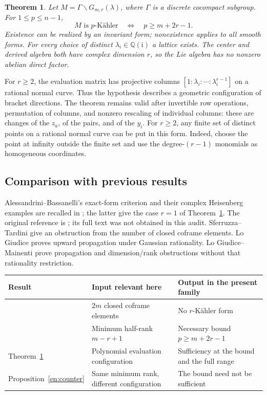 \documentclass[12pt]{amsart}
\newtheorem{thm}{Theorem}[section]
\theoremstyle{definition}
\theoremstyle{remark}
\numberwithin{equation}{section}
\newcommand{\Q}{\mathbb{Q}}
\newcommand{\ii}{\mathrm i}
\begin{document}
\begin{thm}\label{en:main}
Let $M=\Gamma\backslash G_{m,r}(\lambda)$, where $\Gamma$ is a discrete
cocompact subgroup. For $1\leq p\leq n-1$,
\begin{equation}\label{en:threshold}
 M\text{ is }p\text{-K\"ahler}
 \quad\Longleftrightarrow\quad p\geq m+2r-1.
\end{equation}
Existence can be realized by an invariant form; nonexistence applies to
all smooth forms. For every choice of distinct
$\lambda_i\in\Q(\ii)$ a lattice exists. The center and derived algebra
both have complex dimension $r$, so the Lie algebra has no nonzero
abelian direct factor.
\end{thm}

For $r\geq2$, the evaluation matrix has projective columns
$[1:\lambda_i:\cdots:\lambda_i^{r-1}]$ on a rational normal curve.
Thus the hypothesis describes a geometric configuration of bracket
directions. The theorem remains valid after invertible row operations,
permutation of columns, and nonzero rescaling of individual columns:
these are changes of the $z_a$, of the pairs, and of the $y_i$.
For $r\geq2$, any finite set of distinct points on a rational normal curve
can be put in this form. Indeed, choose the point at infinity outside the
finite set and use the degree-$(r-1)$ monomials as homogeneous coordinates.

\subsection{Comparison with previous results}
Alessandrini--Bassanelli's exact-form criterion and their complex
Heisenberg examples are recalled in \cite[Proposition 2.15 and
Example 2.16]{en:LM}; the latter give the case $r=1$ of
Theorem~\ref{en:main}. The original reference is \cite{en:AB}; its full
text was not obtained in this audit. Sferruzza--Tardini
\cite[Theorem 2.3]{en:ST} give an obstruction from the number of closed
coframe elements. Lo Giudice \cite[Theorem 4.1]{en:LG} proves upward
propagation under Gaussian rationality. Lo Giudice--Mainenti
\cite[Theorems 5.4--5.5 and Lemma 5.7]{en:LM} prove propagation and
dimension/rank obstructions without that rationality restriction.

\begin{center}\small
\begin{tabularx}{\textwidth}{@{}>{\raggedright\arraybackslash}p{3.3cm}>{\raggedright\arraybackslash}X>{\raggedright\arraybackslash}X@{}}
\toprule
Result & Input relevant here & Output in the present family \\
\midrule
\cite[Th.~2.3]{en:ST} & $2m$ closed coframe elements & No $r$-K\"ahler form \\
\cite[Lem.~5.7]{en:LM} & Minimum half-rank $m-r+1$ & Necessary bound $p\geq m+2r-1$ \\
Theorem~\ref{en:main} & Polynomial evaluation configuration & Sufficiency at the bound and the full range \\
Proposition~\ref{en:counter} & Same minimum rank, different configuration & The bound need not be sufficient \\
\bottomrule
\end{tabularx}
\end{center}
\end{document}
